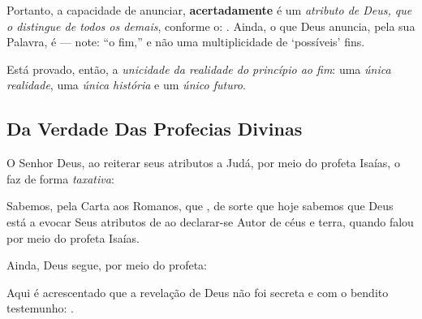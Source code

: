     Portanto, a capacidade de anunciar, \textbf{acertadamente}  é  um  \emph{atributo  de
    Deus, que o distingue de todos os demais}, conforme o: . Ainda, o  que  Deus  anuncia,
    pela sua Palavra, é  --- note: ``o fim,'' e não uma multiplicidade de `possíveis' fins.

    Está provado, então, a \emph{unicidade da realidade do princípio  ao  fim}:  uma  \emph{única  realidade},  uma  \emph{única
    história} e um \emph{único futuro}.

    \subsection{Da Verdade Das Profecias Divinas}

    O Senhor Deus, ao reiterar seus atributos a Judá, por meio do profeta Isaías, o faz de forma \emph{taxativa}:


    Sabemos, pela Carta aos Romanos, que , de sorte que hoje sabemos que Deus está a evocar  Seus  atributos  de   ao declarar-se Autor de céus e terra, quando falou por meio do profeta Isaías.

    Ainda, Deus segue, por meio do profeta:


    Aqui é acrescentado que a revelação de Deus não foi secreta e com o bendito testemunho: .

